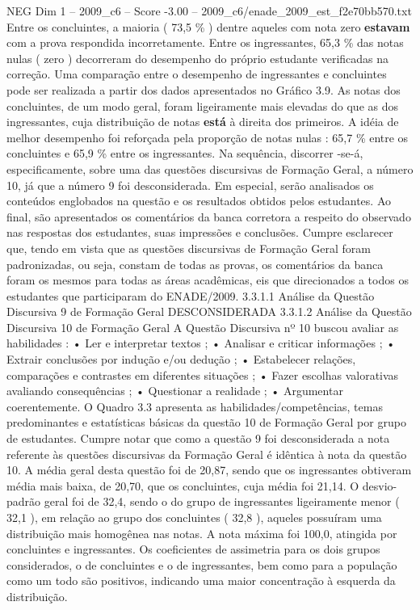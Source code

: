 \begin{textsample}{NEG Dim 1 – 2009\_c6 – Score -3.00 – 2009\_c6/enade\_2009\_est\_f2e70bb570.txt}
Entre os concluintes, a maioria ( 73,5 \% ) dentre aqueles com nota zero \textbf{estavam} com a prova respondida incorretamente.
Entre os ingressantes, 65,3 \% das notas nulas ( zero ) decorreram do desempenho do próprio estudante verificadas na correção.
Uma comparação entre o desempenho de ingressantes e concluintes pode ser realizada a partir dos dados apresentados no Gráfico 3.9.
As notas dos concluintes, de um modo geral, foram ligeiramente mais elevadas do que as dos ingressantes, cuja distribuição de notas \textbf{está} à direita dos primeiros.
A idéia de melhor desempenho foi reforçada pela proporção de notas nulas : 65,7 \% entre os concluintes e 65,9 \% entre os ingressantes.
Na sequência, discorrer -se-á, especificamente, sobre uma das questões discursivas de Formação Geral, a número 10, já que a número 9 foi desconsiderada.
Em especial, serão analisados os conteúdos englobados na questão e os resultados obtidos pelos estudantes.
Ao final, são apresentados os comentários da banca corretora a respeito do observado nas respostas dos estudantes, suas impressões e conclusões.
Cumpre esclarecer que, tendo em vista que as questões discursivas de Formação Geral foram padronizadas, ou seja, constam de todas as provas, os comentários da banca foram os mesmos para todas as áreas acadêmicas, eis que direcionados a todos os estudantes que participaram do ENADE/2009. 3.3.1.1 Análise da Questão Discursiva 9 de Formação Geral DESCONSIDERADA 3.3.1.2 Análise da Questão Discursiva 10 de Formação Geral A Questão Discursiva nº 10 buscou avaliar as habilidades : • Ler e interpretar textos ; • Analisar e criticar informações ; • Extrair conclusões por indução e/ou dedução ; • Estabelecer relações, comparações e contrastes em diferentes situações ; • Fazer escolhas valorativas avaliando consequências ; • Questionar a realidade ; • Argumentar coerentemente.
O Quadro 3.3 apresenta as habilidades/competências, temas predominantes e estatísticas básicas da questão 10 de Formação Geral por grupo de estudantes.
Cumpre notar que como a questão 9 foi desconsiderada a nota referente às questões discursivas da Formação Geral é idêntica à nota da questão 10.
A média geral desta questão foi de 20,87, sendo que os ingressantes obtiveram média mais baixa, de 20,70, que os concluintes, cuja média foi 21,14.
O desvio-padrão geral foi de 32,4, sendo o do grupo de ingressantes ligeiramente menor ( 32,1 ), em relação ao grupo dos concluintes ( 32,8 ), aqueles possuíram uma distribuição mais homogênea nas notas.
A nota máxima foi 100,0, atingida por concluintes e ingressantes.
Os coeficientes de assimetria para os dois grupos considerados, o de concluintes e o de ingressantes, bem como para a população como um todo são positivos, indicando uma maior concentração à esquerda da distribuição.

\end{textsample}

